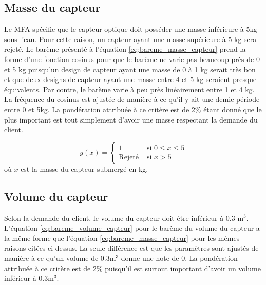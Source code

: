 
\subsection{Masse du capteur}

Le MFA spécifie que le capteur optique doit posséder une masse inférieure à 5kg sous l'eau. Pour cette raison, un capteur ayant une masse supérieure à 5 kg sera rejeté. Le barème présenté à l'équation \ref{eq:bareme_masse_capteur} prend la forme d'une fonction cosinus pour que le barème ne varie pas beaucoup près de 0 et 5 kg puisqu'un design de capteur ayant une masse de 0 à 1 kg serait très bon et que deux designs de capteur ayant une masse entre 4 et 5 kg seraient presque équivalents. Par contre, le barème varie à peu près linéairement entre 1 et 4 kg. La fréquence du cosinus est ajustée de manière à ce qu'il y ait une demie période entre 0 et 5kg. La pondération attribuée à ce critère est de 2$\%$ étant donné que le plus important est tout simplement d'avoir une masse respectant la demande du client.

\begin{equation}
y(x) = \begin{cases}
        1 & \text{ si } 0 \le x \leq 5\\
        \text{Rejeté} & \text{ si } x > 5
    \end{cases}
    \label{eq:bareme_masse_capteur}
\end{equation}
où $x$ est la masse du capteur submergé en kg.

\subsection{Volume du capteur}


Selon la demande du client, le volume du capteur doit être inférieur à 0.3 m$^3$. L'équation \ref{eq:bareme_volume_capteur} pour le barème du volume du capteur a la même forme que l'équation \ref{eq:bareme_masse_capteur} pour les mêmes raisons citées ci-dessus. La seule différence est que les paramètres sont ajustés de manière à ce qu'un volume de 0.3m$^3$ donne une note de 0. La pondération attribuée à ce critère est de 2$\%$ puisqu'il est surtout important d'avoir un volume inférieur à 0.3m$^3$.

